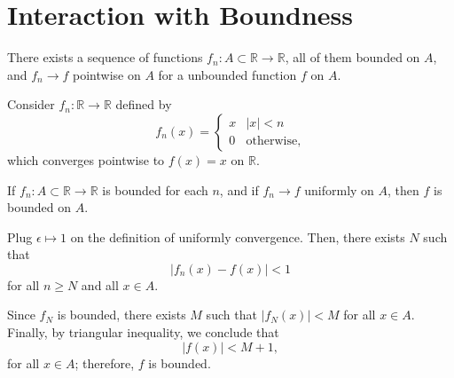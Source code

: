 
\section{Interaction with Boundness}

\begin{prop}{}{}
  There exists a sequence of functions \(f_n \colon A \subset \mathbb{R} \to \mathbb{R}\), all of them bounded on \(A\), and \(f_n \to f\) pointwise on \(A\) for a unbounded function \(f\) on \(A\).
\end{prop}

\begin{dem}{}{}
  Consider \(f_n \colon \mathbb{R} \to \mathbb{R}\) defined by \[
    f_n(x) = 
	\begin{cases}
	  x & |x| < n \\
	  0 & \text{otherwise,}
	\end{cases}
  \]
  which converges pointwise to \(f(x) = x\) on \(\mathbb{R}\).
\end{dem}

\begin{prop}{}{}
  If \(f_n \colon A \subset \mathbb{R} \to \mathbb{R}\) is bounded for each \(n\), and if \(f_n \to f\) uniformly on \(A\), then \(f\) is bounded on \(A\).
\end{prop}

\begin{dem}{}{}
  Plug \(\epsilon \mapsto 1\) on the definition of uniformly convergence. Then, there exists \(N\) such that \[
    |f_n(x) - f(x)| < 1
  \] 
  for all \(n \geq N\) and all \(x \in A\).

  Since \(f_N\) is bounded, there exists \(M\) such that \(|f_N(x)| < M\) for all \(x \in A\).
  Finally, by triangular inequality, we conclude that \[
    |f(x)| < M + 1,
  \] 
  for all \(x \in A\); therefore, \(f\) is bounded.
\end{dem}
